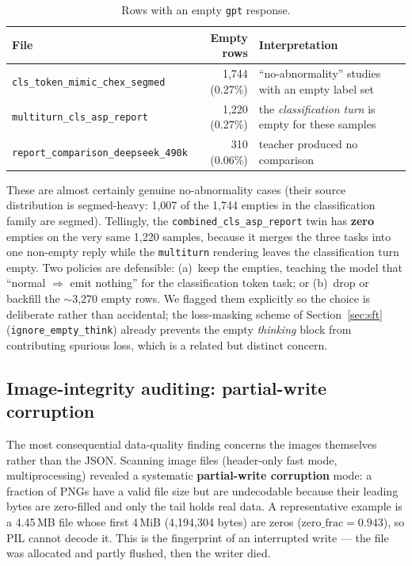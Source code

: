 \documentclass[11pt,a4paper]{article}
\begin{document}
\begin{table}[H]
\centering\footnotesize
\caption{Rows with an empty \texttt{gpt} response.}
\label{tab:empty}
\begin{tabularx}{\textwidth}{L r L}
\toprule
\textbf{File} & \textbf{Empty rows} & \textbf{Interpretation} \\
\midrule
\texttt{cls\_token\_mimic\_chex\_segmed} & 1{,}744 (0.27\%) & ``no-abnormality'' studies with an empty label set \\
\texttt{multiturn\_cls\_asp\_report} & 1{,}220 (0.27\%) & the \emph{classification turn} is empty for these samples \\
\texttt{report\_comparison\_deepseek\_490k} & 310 (0.06\%) & teacher produced no comparison \\
\bottomrule
\end{tabularx}
\end{table}

These are almost certainly genuine no-abnormality cases (their source distribution is segmed-heavy: 1{,}007 of the 1{,}744 empties in the classification family are segmed). Tellingly, the \texttt{combined\_cls\_asp\_report} twin has \textbf{zero} empties on the very same 1{,}220 samples, because it merges the three tasks into one non-empty reply while the \texttt{multiturn} rendering leaves the classification turn empty. Two policies are defensible: (a)~keep the empties, teaching the model that ``normal $\Rightarrow$ emit nothing'' for the classification token task; or (b)~drop or backfill the $\sim$3{,}270 empty rows. We flagged them explicitly so the choice is deliberate rather than accidental; the loss-masking scheme of Section~\ref{sec:sft} (\texttt{ignore\_empty\_think}) already prevents the empty \emph{thinking} block from contributing spurious loss, which is a related but distinct concern.

\subsection{Image-integrity auditing: partial-write corruption}
\label{sec:corruption}
The most consequential data-quality finding concerns the images themselves rather than the JSON. Scanning image files (header-only fast mode, multiprocessing) revealed a systematic \textbf{partial-write corruption} mode: a fraction of PNGs have a valid file size but are undecodable because their leading bytes are zero-filled and only the tail holds real data. A representative example is a 4.45\,MB file whose first 4\,MiB (4{,}194{,}304 bytes) are zeros ($\text{zero\_frac}=0.943$), so PIL cannot decode it. This is the fingerprint of an interrupted write --- the file was allocated and partly flushed, then the writer died.
\end{document}
